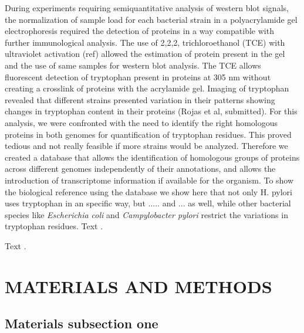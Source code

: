 \documentclass[a4,center,fleqn]{NAR}
\begin{document}
During experiments requiring semiquantitative analysis of western blot signals, the normalization of sample load for each bacterial strain in a polyacrylamide gel electrophoresis required the detection of proteins in a way compatible with further immunological analysis. The use of 2,2,2, trichloroethanol (TCE) with ultraviolet activation (ref) allowed the estimation of protein present in the gel and the use of  same samples for western blot analysis. The TCE allows fluorescent detection of tryptophan present in proteins at 305 nm without creating a crosslink of proteins with the acrylamide gel. Imaging of tryptophan revealed that different strains presented variation in their patterns showing changes in tryptophan content in their proteins (Rojas et al, submitted). For this analysis, we were confronted with the need to identify the right homologous proteins in both genomes for quantification of tryptophan residues. This proved tedious and not really feasible if more strains would be analyzed. Therefore we created a database that allows the identification of homologous groups of proteins across different genomes independently of their annotations, and allows the introduction of transcriptome information if available for the organism. To show the biological reference using the database we show here that not only H. pylori uses tryptophan in an specific way, but ..... and ... as well, while other bacterial species like \textit{Escherichia coli} and \textit{Campylobacter pylori} restrict the variations in tryptophan residues.
Text \cite{2,3}.

Text \cite{4}.


\section{MATERIALS AND METHODS}

\subsection{Materials subsection one}
\end{document}
